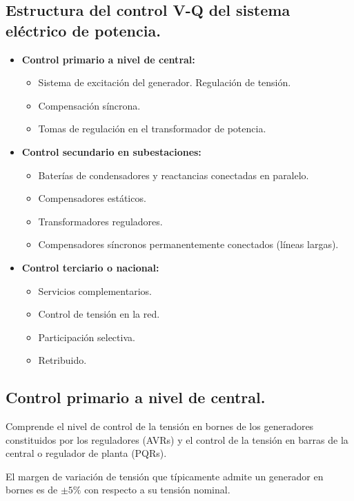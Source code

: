 		\subsection{Estructura del control V-Q del sistema eléctrico de potencia.}
			\begin{itemize}
				\item \textbf{Control primario a nivel de central:}
					\begin{itemize}
						\item Sistema de excitación del generador. Regulación de tensión.
						\item Compensación síncrona.
						\item Tomas de regulación en el transformador de potencia.
					\end{itemize}
				\item \textbf{Control secundario en subestaciones:}
					\begin{itemize}
						\item Baterías de condensadores y reactancias conectadas en paralelo.
						\item Compensadores estáticos.
						\item Transformadores reguladores.
						\item Compensadores síncronos permanentemente conectados (líneas largas).
					\end{itemize}
				\item \textbf{Control terciario o nacional:}
					\begin{itemize}
						\item Servicios complementarios.
						\item Control de tensión en la red.
						\item Participación selectiva.
						\item Retribuido.
					\end{itemize}
			\end{itemize}
		
		\subsection{Control primario a nivel de central.}
			Comprende el nivel de control de la tensión en bornes de los generadores constituidos por los reguladores (AVRs) y el control de la tensión en barras de la central o regulador de planta (PQRs).
			
			
			El margen de variación de tensión que típicamente admite un generador en bornes es de $\pm5\%$ con respecto a su tensión nominal.
			
